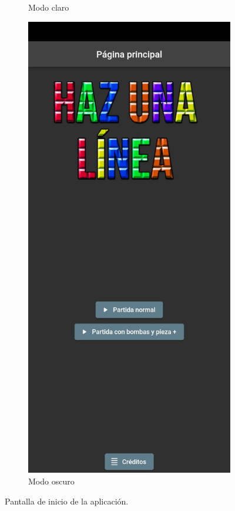 \documentclass{article}
\begin{document}
\begin{figure}[H]
\begin{subfigure}{0.5\textwidth}
          \caption{Modo claro}
  \end{subfigure}
  \begin{subfigure}{0.5\textwidth}
          \includegraphics[width=\textwidth]{imagenes/captura1dark.jpeg}
          \caption{Modo oscuro}
  \end{subfigure}
  \caption{Pantalla de inicio de la aplicación.}
\end{figure}
\end{document}
